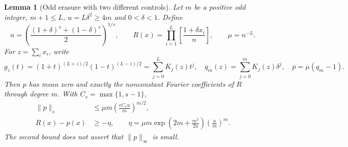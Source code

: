 \documentclass[11pt]{article}
\newtheorem{lemma}[theorem]{Lemma}
\begin{document}
\begin{lemma}[Odd erasure with two different controls]
\label{lem:332-erasure}
Let $m$ be a positive odd integer, $m+1\le L$, $u=L\delta^2\ge4m$ and $0<\delta<1$.
Define
\[
 n=\left(\frac{(1+\delta)^s+(1-\delta)^s}{2}\right)^{1/s},
 \qquad R(x)=\prod_{i=1}^L\left[\frac{1+\delta x_i}{n}\right],
 \qquad \mu=n^{-L}.
\]
For $z=\sum_i x_i$, write
\[
 g_z(t)=(1+t)^{(L+z)/2}(1-t)^{(L-z)/2}
       =\sum_{j=0}^L K_j(z)t^j,\quad
 q_m(z)=\sum_{j=0}^m K_j(z)\delta^j,\quad p=\mu(q_m-1).
\]
Then $p$ has mean zero and exactly the nonconstant Fourier coefficients
of $R$ through degree $m$. With $C_s=\max\{1,s-1\}$,
\begin{align}
 \|p\|_s&\le\mu m\left(\frac{eC_su}{m}\right)^{m/2},
       \label{eq:332-ls}\\
 R(x)-p(x)&\ge-\eta,
 \qquad \eta=\mu m\exp\left(2m+\frac{m^2}{2u}\right)
                     \left(\frac{u}{m}\right)^m.
       \label{eq:332-one-sided}
\end{align}
The second bound does not assert that $\|p\|_\infty$ is small.
\end{lemma}
\end{document}

